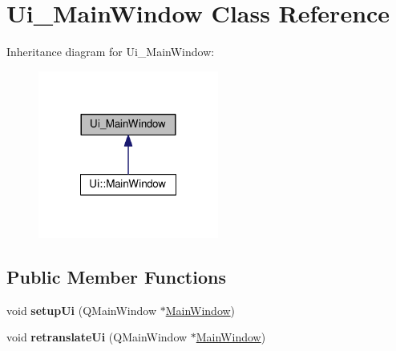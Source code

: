 \hypertarget{class_ui___main_window}{}\section{Ui\+\_\+\+Main\+Window Class Reference}
\label{class_ui___main_window}


Inheritance diagram for Ui\+\_\+\+Main\+Window\+:
\nopagebreak
\begin{figure}[H]
\begin{center}
\leavevmode
\includegraphics[width=168pt]{class_ui___main_window__inherit__graph}
\end{center}
\end{figure}
\subsection*{Public Member Functions}
\begin{DoxyCompactItemize}
\item 
void {\bfseries setup\+Ui} (Q\+Main\+Window $\ast$\hyperlink{class_main_window}{Main\+Window})\hypertarget{class_ui___main_window_acf4a0872c4c77d8f43a2ec66ed849b58}{}\label{class_ui___main_window_acf4a0872c4c77d8f43a2ec66ed849b58}

\item 
void {\bfseries retranslate\+Ui} (Q\+Main\+Window $\ast$\hyperlink{class_main_window}{Main\+Window})\hypertarget{class_ui___main_window_a097dd160c3534a204904cb374412c618}{}\label{class_ui___main_window_a097dd160c3534a204904cb374412c618}

\end{DoxyCompactItemize}
